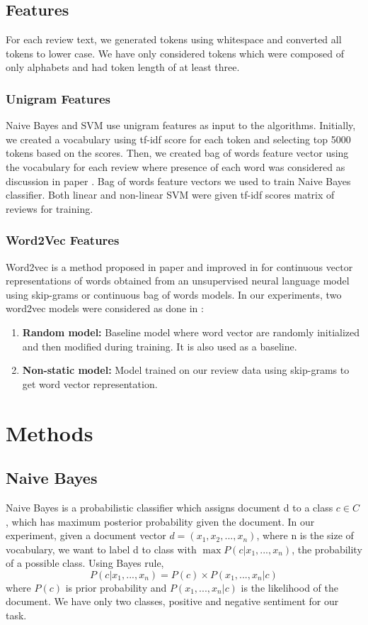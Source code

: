 \documentclass[11pt]{article}
\begin{document}
		\subsection{Features}
			For each review text, we generated tokens using whitespace and converted all tokens to lower case. We have only considered tokens which were composed of only alphabets and had token length of at least three.
			\subsubsection{Unigram Features}
			Naive Bayes and SVM use unigram features as input to the algorithms. Initially, we created a vocabulary using tf-idf score for each token and selecting top 5000 tokens based on the scores. Then, we created bag of words feature vector using the vocabulary for each review where presence of each word was considered as discussion in paper \cite{plv}. Bag of words feature vectors we used to train Naive Bayes classifier. Both linear and non-linear SVM were given tf-idf scores matrix of reviews for training.
			
			\subsubsection{Word2Vec Features}  
			Word2vec is a method proposed in paper \cite{w2v1} and improved in \cite{w2v2} for continuous vector representations of words obtained from an unsupervised neural language model using skip-grams or continuous bag of words models. In our experiments, two word2vec models were considered as done in \cite{kim}:
			\begin{enumerate}
				\item \textbf{Random model:} Baseline model where word vector are randomly initialized and then modified during training. It is also used as a baseline.
				\item \textbf{Non-static model:} Model trained on our review data using skip-grams to get word vector representation.
			\end{enumerate}
		
	\section{Methods}
		\subsection{Naive Bayes}
		Naive Bayes is a probabilistic classifier which assigns document d to a class $c \in C$ , which has maximum posterior probability given the document. In our experiment, given a document vector $d=(x_1,x_2,...,x_n)$, where n is the size of vocabulary, we want to label d to class with $\max{P(c|x_1,...,x_n)}$, the probability of a possible class. Using Bayes rule, 
			\[
				P(c|x_1,...,x_n) = P(c) \times P(x_1,...,x_n | c)
			\]  
		where $P(c)$  is prior probability and $P(x_1,...,x_n | c)$ is the likelihood of the document. We have only two classes, positive and negative sentiment for our task.
		
\end{document}
